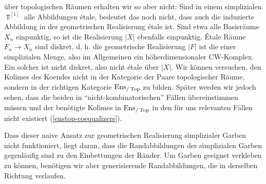 über topologischen Räumen erhalten wir so aber nicht: Sind in einem
simplizialen $\Top^{[1]}$ alle Abbildungen étale, bedeutet das noch
nicht, dass auch die induzierte Abbildung in der geometrischen
Realisierung étale ist. Sind etwa alle Basisräume $X_n$ einpunktig, so
ist die Realisierung $|X|$ ebenfalls einpunktig. Étale Räume $F_n \to
X_n$ sind diskret, d. h. die geometrische Realisierung $|F|$ ist die
einer simplizialen Menge, also im Allgemeinen ein höherdimensionaler
CW-Komplex. Ein solcher ist nicht diskret, also nicht étale über
$|X|$. Wir können versuchen, den Kolimes des Koendes nicht in der
Kategorie der Paare topologischer Räume, sondern in der richtigen
Kategorie $\operatorname{Ens}_{/\operatorname{Top}}$ zu bilden. Später werden wir jedoch sehen, dass
die beiden in ``nicht-kombinatorischen'' Fällen übereinstimmen müssen
und der benötigte Kolimes in $\operatorname{Ens}_{/\operatorname{Top}}$ in den für uns relevanten
Fällen nicht existiert (\ref{enstop-coequalizers}).

Dass dieser naive Ansatz zur geometrischen Realisierung simplizialer
Garben nicht funktioniert, liegt daran, dass die Randabbildungen der
simplizialen Garben gegenläufig sind zu den Einbettungen der
Ränder. Um Garben geeignet verkleben zu können, benötigen wir aber
generisierende Randabbildungen, die in derselben Richtung verlaufen.

